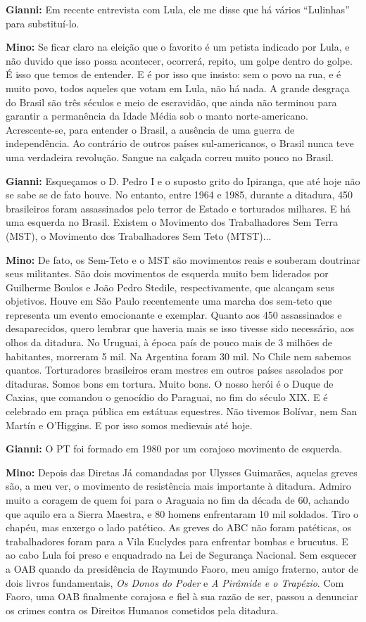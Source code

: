 \textbf{Gianni:} Em recente entrevista com Lula, ele me disse que há
vários ``Lulinhas'' para substituí-lo.

\textbf{Mino:} Se ficar claro na eleição que o favorito é um petista
indicado por Lula, e não duvido que isso possa acontecer, ocorrerá,
repito, um golpe dentro do golpe. É isso que temos de entender. E é por
isso que insisto: sem o povo na rua, e é muito povo, todos aqueles que
votam em Lula, não há nada. A grande desgraça do Brasil são três séculos
e meio de escravidão, que ainda não terminou para garantir a permanência
da Idade Média sob o manto norte-americano. Acrescente-se, para entender
o Brasil, a ausência de uma guerra de independência. Ao contrário de
outros países sul-americanos, o Brasil nunca teve uma verdadeira
revolução. Sangue na calçada correu muito pouco no Brasil.

\textbf{Gianni:} Esqueçamos o D. Pedro I e o suposto grito do Ipiranga,
que até hoje não se sabe se de fato houve. No entanto, entre 1964 e
1985, durante a ditadura, 450 brasileiros foram assassinados pelo terror
de Estado e torturados milhares. E há uma esquerda no Brasil. Existem o
Movimento dos Trabalhadores Sem Terra (MST), o Movimento dos
Trabalhadores Sem Teto (MTST)...

\textbf{Mino:} De fato, os Sem-Teto e o MST são movimentos reais e
souberam doutrinar seus militantes. São dois movimentos de esquerda
muito bem liderados por Guilherme Boulos e João Pedro Stedile,
respectivamente, que alcançam seus objetivos. Houve em São Paulo
recentemente uma marcha dos sem-teto que representa um evento
emocionante e exemplar. Quanto aos 450 assassinados e desaparecidos,
quero lembrar que haveria mais se isso tivesse sido necessário, aos
olhos da ditadura. No Uruguai, à época país de pouco mais de 3 milhões
de habitantes, morreram 5 mil. Na Argentina foram 30 mil. No Chile nem
sabemos quantos. Torturadores brasileiros eram mestres em outros países
assolados por ditaduras. Somos bons em tortura. Muito bons. O nosso
herói é o Duque de Caxias, que comandou o genocídio do Paraguai, no fim
do século XIX. E é celebrado em praça pública em estátuas equestres. Não
tivemos Bolívar, nem San Martín e O'Higgins. E por isso somos medievais
até hoje.

\textbf{Gianni:} O PT foi formado em 1980 por um corajoso movimento de
esquerda.

\textbf{Mino:} Depois das Diretas Já comandadas por Ulysses Guimarães,
aquelas greves são, a meu ver, o movimento de resistência mais
importante à ditadura. Admiro muito a coragem de quem foi para o
Araguaia no fim da década de 60, achando que aquilo era a Sierra
Maestra, e 80 homens enfrentaram 10 mil soldados. Tiro o chapéu, mas
enxergo o lado patético. As greves do ABC não foram patéticas, os
trabalhadores foram para a Vila Euclydes para enfrentar bombas e
brucutus. E ao cabo Lula foi preso e enquadrado na Lei de Segurança
Nacional. Sem esquecer a OAB quando da presidência de Raymundo Faoro,
meu amigo fraterno, autor de dois livros fundamentais, \emph{Os Donos}
\emph{do Poder} e \emph{A Pirâmide e o Trapézio}. Com Faoro, uma OAB
finalmente corajosa e fiel à sua razão de ser, passou a denunciar os
crimes contra os Direitos Humanos cometidos pela ditadura.

